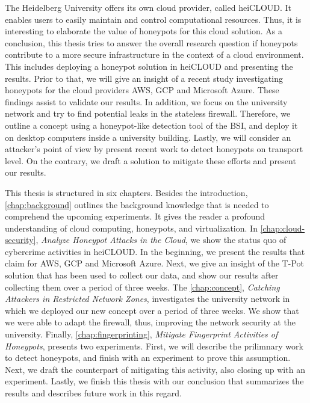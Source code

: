 The Heidelberg University offers its own cloud provider, called heiCLOUD.
It enables users to easily maintain and control computational resources. 
Thus, it is interesting to elaborate the value of honeypots for this cloud solution.
As a conclusion, this thesis tries to answer the overall research question if honeypots contribute to a more secure infrastructure in the context of a cloud environment.
This includes deploying a honeypot solution in heiCLOUD and presenting the results.
Prior to that, we will give an insight of a recent study investigating honeypots for the cloud providers AWS, GCP and Microsoft Azure.
These findings assist to validate our results.
In addition, we focus on the university network and try to find potential leaks in the stateless firewall.
Therefore, we outline a concept using a honeypot-like detection tool of the BSI, and deploy it on desktop computers inside a university building.
Lastly, we will consider an attacker's point of view by present recent work to detect honeypots on transport level.
On the contrary, we draft a solution to mitigate these efforts and present our results.

This thesis is structured in six chapters.
Besides the introduction, \autoref{chap:background} outlines the background knowledge that is needed to comprehend the upcoming experiments.
It gives the reader a profound understanding of cloud computing, honeypots, and virtualization.
In \autoref{chap:cloud-security}, \textit{Analyze Honeypot Attacks in the Cloud}, we show the status quo of cybercrime activities in heiCLOUD.
In the beginning, we present the results that \citet{Kelly2021} claim for AWS, GCP and Microsoft Azure.
Next, we give an insight of the T-Pot solution that has been used to collect our data, and show our results after collecting them over a period of three weeks.
The \autoref{chap:concept}, \textit{Catching Attackers in Restricted Network Zones}, investigates the university network in which we deployed our new concept over a period of three weeks.
We show that we were able to adapt the firewall, thus, improving the network security at the university.
Finally, \autoref{chap:fingerprinting}, \textit{Mitigate Fingerprint Activities of Honeypots}, presents two experiments.
First, we will describe the prilimnary work to detect honeypots, and finish with an experiment to prove this assumption.
Next, we draft the counterpart of mitigating this activity, also closing up with an experiment.
Lastly, we finish this thesis with our conclusion that summarizes the results and describes future work in this regard.

